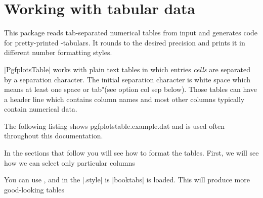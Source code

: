 \chapter{Working with tabular data}

This  package reads tab-separated numerical tables from input and generates code for pretty-printed
\latex -tabulars. It rounds to the desired precision and prints it in different number formatting styles.

|PgfplotsTable| works with plain text  tables in which entries \emph{cells} are separated by a separation
character. The initial separation character is white space which means at least one space or tab"(see
option col sep below). Those tables can have a header line which contains column names and most other
columns typically contain numerical data.

The following listing shows pgfplotstable.example.dat and is used often throughout this documentation.

\medskip
\begin{fullwidth}
\end{fullwidth}
\medskip

In the sections that follow you will see how to format the tables. First, we will see how we can select only particular
columns

\begin{teX}
\end{teX}

\medskip


\medskip


\medskip


You can use ,  and  in the |.style| is |booktabs| is loaded. This will
produce more good-looking tables
\medskip
\begin{teX}
\end{teX}
\medskip





